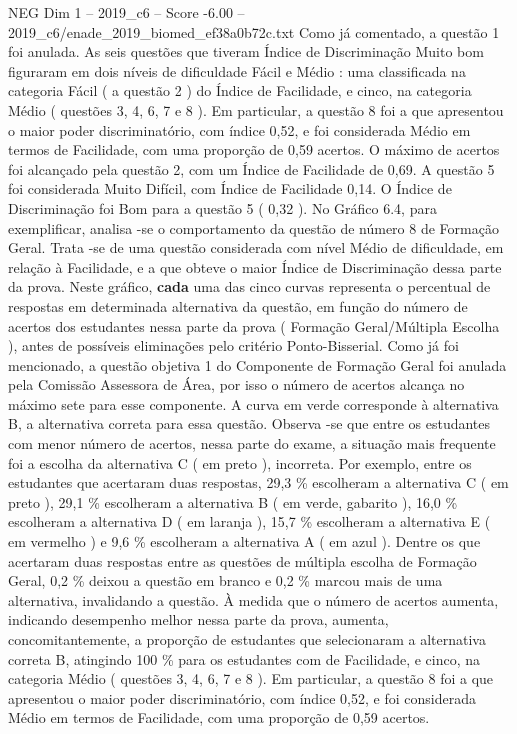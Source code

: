 \begin{textsample}{NEG Dim 1 – 2019\_c6 – Score -6.00 – 2019\_c6/enade\_2019\_biomed\_ef38a0b72c.txt}
Como já comentado, a questão 1 foi anulada.
As seis questões que tiveram Índice de Discriminação Muito bom figuraram em dois níveis de dificuldade Fácil e Médio : uma classificada na categoria Fácil ( a questão 2 ) do Índice de Facilidade, e cinco, na categoria Médio ( questões 3, 4, 6, 7 e 8 ).
Em particular, a questão 8 foi a que apresentou o maior poder discriminatório, com índice 0,52, e foi considerada Médio em termos de Facilidade, com uma proporção de 0,59 acertos.
O máximo de acertos foi alcançado pela questão 2, com um Índice de Facilidade de 0,69.
A questão 5 foi considerada Muito Difícil, com Índice de Facilidade 0,14.
O Índice de Discriminação foi Bom para a questão 5 ( 0,32 ).
No Gráfico 6.4, para exemplificar, analisa -se o comportamento da questão de número 8 de Formação Geral.
Trata -se de uma questão considerada com nível Médio de dificuldade, em relação à Facilidade, e a que obteve o maior Índice de Discriminação dessa parte da prova.
Neste gráfico, \textbf{cada} uma das cinco curvas representa o percentual de respostas em determinada alternativa da questão, em função do número de acertos dos estudantes nessa parte da prova ( Formação Geral/Múltipla Escolha ), antes de possíveis eliminações pelo critério Ponto-Bisserial.
Como já foi mencionado, a questão objetiva 1 do Componente de Formação Geral foi anulada pela Comissão Assessora de Área, por isso o número de acertos alcança no máximo sete para esse componente.
A curva em verde corresponde à alternativa B, a alternativa correta para essa questão.
Observa -se que entre os estudantes com menor número de acertos, nessa parte do exame, a situação mais frequente foi a escolha da alternativa C ( em preto ), incorreta.
Por exemplo, entre os estudantes que acertaram duas respostas, 29,3 \% escolheram a alternativa C ( em preto ), 29,1 \% escolheram a alternativa B ( em verde, gabarito ), 16,0 \% escolheram a alternativa D ( em laranja ), 15,7 \% escolheram a alternativa E ( em vermelho ) e 9,6 \% escolheram a alternativa A ( em azul ).
Dentre os que acertaram duas respostas entre as questões de múltipla escolha de Formação Geral, 0,2 \% deixou a questão em branco e 0,2 \% marcou mais de uma alternativa, invalidando a questão.
À medida que o número de acertos aumenta, indicando desempenho melhor nessa parte da prova, aumenta, concomitantemente, a proporção de estudantes que selecionaram a alternativa correta B, atingindo 100 \% para os estudantes com de Facilidade, e cinco, na categoria Médio ( questões 3, 4, 6, 7 e 8 ).
Em particular, a questão 8 foi a que apresentou o maior poder discriminatório, com índice 0,52, e foi considerada Médio em termos de Facilidade, com uma proporção de 0,59 acertos.

\end{textsample}
